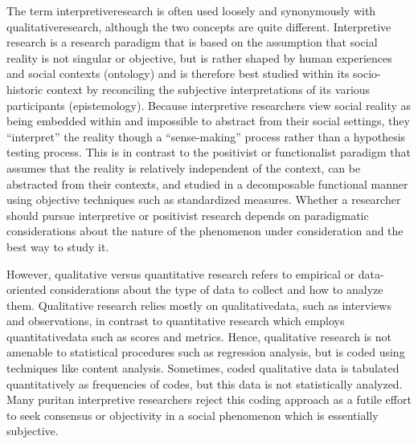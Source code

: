 The term \gls{interpretiveresearch} is often used loosely and synonymously with \gls{qualitativeresearch}, although the two concepts are quite different. Interpretive research is a research paradigm that is based on the assumption that social reality is not singular or objective, but is rather shaped by human experiences and social contexts (\gls{ontology}) and is therefore best studied within its socio-historic context by reconciling the subjective interpretations of its various participants (\gls{epistemology}). Because interpretive researchers view social reality as being embedded within and impossible to abstract from their social settings, they ``interpret'' the reality though a ``sense-making'' process rather than a hypothesis testing process. This is in contrast to the positivist or functionalist paradigm that assumes that the reality is relatively independent of the context, can be abstracted from their contexts, and studied in a decomposable functional manner using objective techniques such as standardized measures. Whether a researcher should pursue interpretive or positivist research depends on paradigmatic considerations about the nature of the phenomenon under consideration and the best way to study it.

However, qualitative versus quantitative research refers to empirical or data-oriented considerations about the type of data to collect and how to analyze them. Qualitative research relies mostly on \gls{qualitativedata}, such as interviews and observations, in contrast to quantitative research which employs \gls{quantitativedata} such as scores and metrics. Hence, qualitative research is not amenable to statistical procedures such as regression analysis, but is coded using techniques like content analysis. Sometimes, coded qualitative data is tabulated quantitatively as frequencies of codes, but this data is not statistically analyzed. Many puritan interpretive researchers reject this coding approach as a futile effort to seek consensus or objectivity in a social phenomenon which is essentially subjective.

